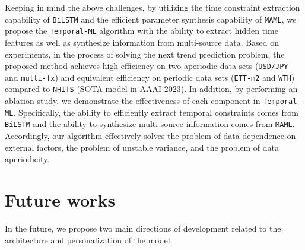 
Keeping in mind the above challenges, by utilizing the time constraint extraction capability of \verb|BiLSTM| and the efficient parameter synthesis capability of \verb|MAML|, we propose the \verb|Temporal-ML| algorithm with the ability to extract hidden time features as well as synthesize information from multi-source data. Based on experiments, in the process of solving the next trend prediction problem, the proposed method achieves high efficiency on two aperiodic data sets (\verb|USD/JPY| and \verb|multi-fx|) and equivalent efficiency on periodic data sets (\verb|ETT-m2| and \verb|WTH|) compared to \verb|NHITS| (SOTA model in AAAI 2023). In addition, by performing an ablation study, we demonstrate the effectiveness of each component in \verb|Temporal-ML|. Specifically, the ability to efficiently extract temporal constraints comes from \verb|BiLSTM| and the ability to synthesize multi-source information comes from \verb|MAML|. Accordingly, our algorithm effectively solves the problem of data dependence on external factors, the problem of unstable variance, and the problem of data aperiodicity.

\section{Future works}

In the future, we propose two main directions of development related to the architecture and personalization of the model.

